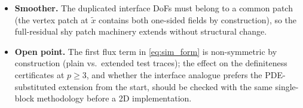 \begin{itemize}
        transfer verbatim.
  \item \textbf{Smoother.} The duplicated interface DoFs must belong to a
        common patch (the vertex patch at $\tilde x$ contains both
        one-sided fields by construction), so the full-residual shy patch
        machinery extends without structural change.
  \item \textbf{Open point.} The first flux term in \eqref{eq:sim_form}
        is non-symmetric by construction (plain vs.\ extended test
        traces); the effect on the definiteness certificates at
        $p \ge 3$, and whether the interface analogue prefers the
        PDE-substituted extension from the start, should be checked with
        the same single-block methodology before a 2D implementation.
\end{itemize}

